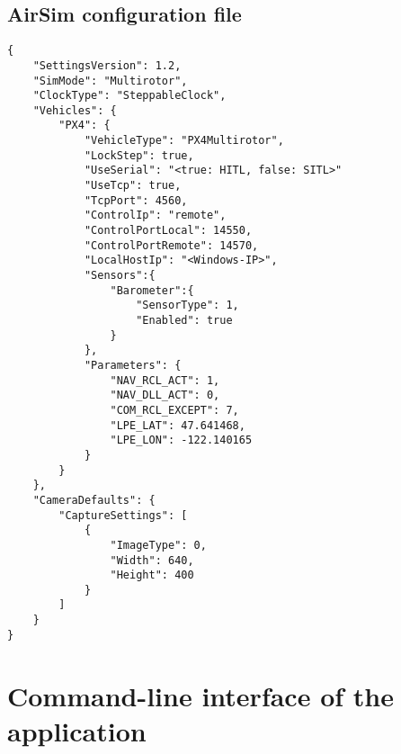 \section{AirSim configuration file}
\label{app:airsim-config}
\begin{verbatim}
{
    "SettingsVersion": 1.2,
    "SimMode": "Multirotor",
    "ClockType": "SteppableClock",
    "Vehicles": {
        "PX4": {
            "VehicleType": "PX4Multirotor",
            "LockStep": true,
            "UseSerial": "<true: HITL, false: SITL>"
            "UseTcp": true,
            "TcpPort": 4560,
            "ControlIp": "remote",
            "ControlPortLocal": 14550,
            "ControlPortRemote": 14570,
            "LocalHostIp": "<Windows-IP>",
            "Sensors":{
                "Barometer":{
                    "SensorType": 1,
                    "Enabled": true
                }
            },
            "Parameters": {
                "NAV_RCL_ACT": 1,
                "NAV_DLL_ACT": 0,
                "COM_RCL_EXCEPT": 7,
                "LPE_LAT": 47.641468,
                "LPE_LON": -122.140165
            }
        }
    },
    "CameraDefaults": {
        "CaptureSettings": [
            {
                "ImageType": 0,
                "Width": 640,
                "Height": 400
            }
        ]
    }
}
\end{verbatim}

\chapter{Command-line interface of the application}
\label{app:cli}

